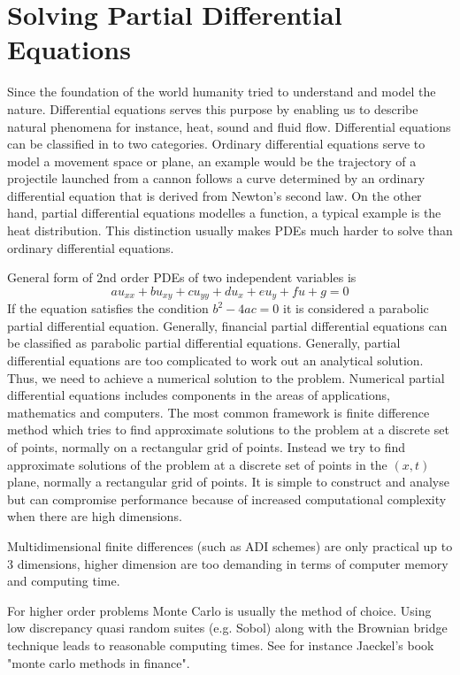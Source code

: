 \documentclass[12pt, oneside]{book}
\theoremstyle{plain}
\theoremstyle{definition}
\begin{document}
\section{Solving Partial Differential Equations}
Since the foundation of the world humanity tried to understand and model the nature. Differential equations serves this purpose by enabling us to describe natural phenomena for instance, heat, sound and fluid flow. 
Differential equations can be classified in to two categories. Ordinary differential equations serve to model a movement space or plane, an example would be the trajectory of a projectile launched from a cannon follows a curve determined by an ordinary differential equation that is derived from Newton's second law.
On the other hand, partial differential equations modelles a function, a typical example is the heat distribution. This distinction usually makes PDEs much harder to solve than ordinary differential equations.

General form of 2nd order PDEs of two independent variables is $$ au_{xx} + bu_{xy} + cu_{yy} + du_x + eu_y + fu + g = 0 $$ If the equation satisfies the condition $ b^2 - 4ac = 0 $  it is considered a parabolic partial differential equation. Generally, financial partial differential equations can be classified as parabolic partial differential equations. Generally, partial differential equations are too complicated to work out an analytical solution. Thus, we need to achieve a numerical solution to the problem. Numerical partial differential equations includes components in the areas of applications, mathematics and computers. The most common framework is finite difference method which tries to find approximate solutions to the problem at a discrete set of points, normally on a rectangular grid of points. Instead we try to find approximate solutions of the problem at a discrete set of points in the $(x, t)$ plane, normally a rectangular grid of points. It is simple to construct and analyse but can compromise performance because of increased computational complexity when there are high dimensions. 

Multidimensional finite differences (such as ADI schemes) are only practical up to 3 dimensions, higher dimension are too demanding in terms of computer memory and computing time.

For higher order problems Monte Carlo is usually the method of choice. Using low discrepancy quasi random suites (e.g. Sobol) along with the Brownian bridge technique leads to reasonable computing times. See for instance Jaeckel's book "monte carlo methods in finance".
\end{document}
